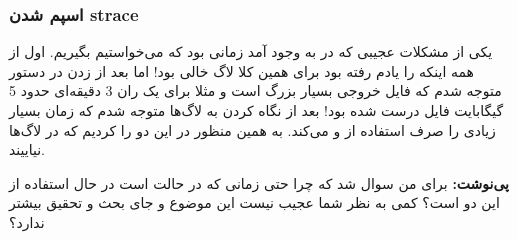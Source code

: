 \subsubsection{اسپم شدن strace}
یکی از مشکلات عجیبی که در
به وجود آمد زمانی بود که می‌خواستیم
بگیریم. اول از همه اینکه
را یادم رفته بود برای همین کلا لاگ خالی بود! اما بعد از زدن
در دستور
متوجه شدم که فایل خروجی بسیار بزرگ است و مثلا برای یک ران 3 دقیقه‌ای حدود 5 گیگابایت فایل درست شده بود!
بعد از نگاه کردن به لاگ‌ها متوجه شدم که
زمان بسیار زیادی را صرف استفاده از
و
می‌کند. به همین منظور در
این دو
 را 
کردیم که در لاگ‌ها نیاییند.

\textbf{پی‌نوشت:} برای من سوال شد که چرا حتی زمانی که  در حالت 
است در حال استفاده از این دو
است؟ کمی به نظر شما عجیب نیست این موضوع و جای بحث و تحقیق بیشتر ندارد؟